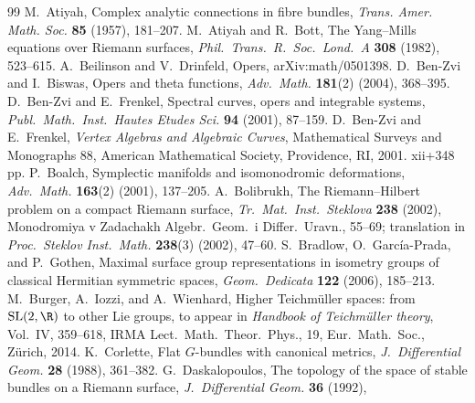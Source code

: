 
\renewcommand{\bibname}{第 4 章参考文献}

\begin{thebibliography}{99}\setlength{\itemsep}{0.25em}
 M.~Atiyah, Complex analytic connections in fibre bundles,
\emph{Trans. Amer. Math. Soc.} \textbf{85} (1957), 181--207.
 M.~Atiyah and R.~Bott, The Yang--Mills equations over Riemann
surfaces, \emph{Phil.\ Trans.\ R.\ Soc.\ Lond.\ A} \textbf{308} (1982), 523--615.
 A.~Beilinson and V.~Drinfeld, Opers, arXiv:math/0501398.
 D.~Ben-Zvi and I.~Biswas, Opers and theta functions,
\emph{Adv.\ Math.} \textbf{181}(2) (2004), 368--395.
 D.~Ben-Zvi and E.~Frenkel, Spectral curves, opers and
integrable systems, \emph{Publ.\ Math.\ Inst.\ Hautes Etudes Sci.} \textbf{94} (2001),
87--159.
 D.~Ben-Zvi and E.~Frenkel, \emph{Vertex Algebras and
Algebraic Curves}, Mathematical Surveys and Monographs 88, American Mathematical
Society, Providence, RI, 2001. xii+348 pp.
 P.~Boalch, Symplectic manifolds and isomonodromic deformations,
\emph{Adv.\ Math.} \textbf{163}(2) (2001), 137--205.
 A.~Bolibrukh, The Riemann--Hilbert problem on a compact Riemann
surface, \emph{Tr.\ Mat.\ Inst.\ Steklova} \textbf{238} (2002), Monodromiya v Zadachakh
Algebr.\ Geom.\ i Differ.\ Uravn., 55--69; translation in \emph{Proc.\ Steklov Inst.\
Math.} \textbf{238}(3) (2002), 47--60.
 S.~Bradlow, O.~Garc\'{i}a-Prada, and P.~Gothen, Maximal surface
group representations in isometry groups of classical Hermitian symmetric spaces,
\emph{Geom.\ Dedicata} \textbf{122} (2006), 185--213.
 M.~Burger, A.~Iozzi, and A.~Wienhard, Higher Teichm\"{u}ller
spaces: from $\mathrm{SL}(2,\R)$ to other Lie groups, to appear in \emph{Handbook of
Teichm\"{u}ller theory}, Vol.~IV, 359--618, IRMA Lect.\ Math.\ Theor.\ Phys., 19,
Eur.\ Math.\ Soc., Z\"{u}rich, 2014.
 K.~Corlette, Flat $G$-bundles with canonical metrics,
\emph{J.\ Differential Geom.} \textbf{28} (1988), 361--382.
 G.~Daskalopoulos, The topology of the space of stable
bundles on a Riemann surface, \emph{J.\ Differential Geom.} \textbf{36} (1992),

\end{thebibliography}
